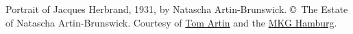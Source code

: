 Portrait of Jacques Herbrand, 1931, by Natascha
Artin-Brunswick. \copyright\ The Estate of Natascha
Artin-Brunswick. Courtesy of \href{http://www.artinarts.com/}{Tom
  Artin} and the \href{http://www.mkg-hamburg.de/en/}{MKG Hamburg}.
